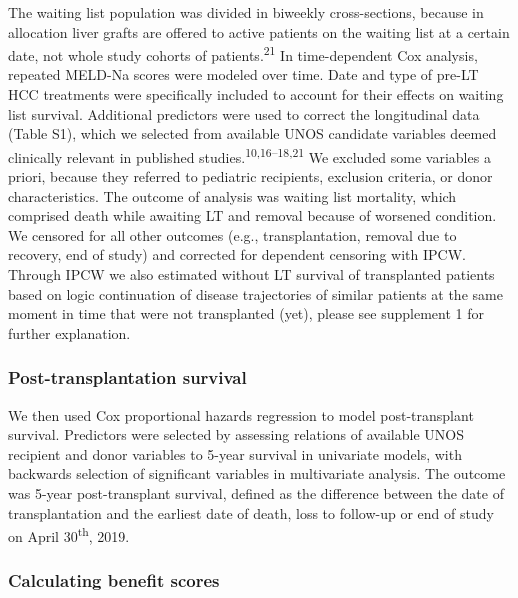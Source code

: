 \documentclass[11pt,english,]{book} %
\begin{document}
The waiting list population was divided in biweekly cross-sections, because in allocation liver grafts are offered to active patients on the waiting list at a certain date, not whole study cohorts of patients.\textsuperscript{21} In time-dependent Cox analysis, repeated MELD-Na scores were modeled over time. Date and type of pre-LT HCC treatments were specifically included to account for their effects on waiting list survival. Additional predictors were used to correct the longitudinal data (Table S1), which we selected from available UNOS candidate variables deemed clinically relevant in published studies.\textsuperscript{10,16--18,21} We excluded some variables a priori, because they referred to pediatric recipients, exclusion criteria, or donor characteristics. The outcome of analysis was waiting list mortality, which comprised death while awaiting LT and removal because of worsened condition. We censored for all other outcomes (e.g., transplantation, removal due to recovery, end of study) and corrected for dependent censoring with IPCW. Through IPCW we also estimated without LT survival of transplanted patients based on logic continuation of disease trajectories of similar patients at the same moment in time that were not transplanted (yet), please see supplement 1 for further explanation.

\hypertarget{post-transplantation-survival}{%
\subsubsection*{Post-transplantation survival}\label{post-transplantation-survival}}

We then used Cox proportional hazards regression to model post-transplant survival. Predictors were selected by assessing relations of available UNOS recipient and donor variables to 5-year survival in univariate models, with backwards selection of significant variables in multivariate analysis. The outcome was 5-year post-transplant survival, defined as the difference between the date of transplantation and the earliest date of death, loss to follow-up or end of study on April 30\textsuperscript{th}, 2019.

\hypertarget{calculating-benefit-scores}{%
\subsubsection*{Calculating benefit scores}\label{calculating-benefit-scores}}
\end{document}

